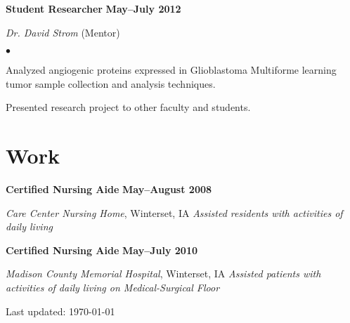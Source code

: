\documentclass[10pt,letterpaper]{article}
\renewenvironment{itemize}{
  \begin{list}{}{
      \setlength{\leftmargin}{1.5em}
      \setlength{\itemsep}{0.25em}
      \setlength{\parskip}{0pt}
      \setlength{\parsep}{0.25em}
    }
  }{
  \end{list}
}
\newenvironment{bitemize}{
  \begin{list}{$\bullet$}{
      \setlength{\leftmargin}{1.5em}
      \setlength{\itemsep}{0.25em}
      \setlength{\parskip}{0pt}
      \setlength{\parsep}{0.25em}
    }
  }{
  \end{list}
}
\newcommand{\yearrange}[1]{\hfill \textbf{#1} \par}
\begin{document}
\begin{itemize}
\item \textbf{Student Researcher} \yearrange{May--July 2012}
  \textit{Dr. David Strom} (Mentor)
  \begin{bitemize}
  \item Analyzed angiogenic proteins expressed in Glioblastoma
    Multiforme learning tumor sample collection and analysis
    techniques. 
  \item Presented research project to other faculty and students.
  \end{bitemize}
\end{itemize}

\section*{Work}

\begin{itemize}
\item \textbf{Certified Nursing Aide} \yearrange{May--August 2008}
  \textit{Care Center Nursing Home}, Winterset, IA
  \textit{Assisted residents with activities of daily living}
\item \textbf{Certified Nursing Aide} \yearrange{May--July 2010}
  \textit{Madison County Memorial Hospital}, Winterset, IA
  \textit{Assisted patients with activities of daily living on Medical-Surgical Floor}
\end{itemize}

\medskip

\begin{center}
  \begin{small}
    Last updated: \today
  \end{small}
\end{center}
\end{document}
